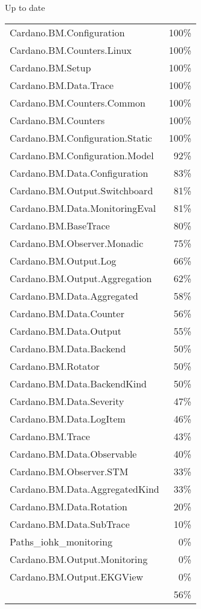 Up to date
\begin{tabular}{l r}
   Cardano.BM.Configuration & 100\% \\
   Cardano.BM.Counters.Linux & 100\% \\
   Cardano.BM.Setup & 100\% \\
   Cardano.BM.Data.Trace & 100\% \\
   Cardano.BM.Counters.Common & 100\% \\
   Cardano.BM.Counters & 100\% \\
   Cardano.BM.Configuration.Static & 100\% \\
   Cardano.BM.Configuration.Model & 92\% \\
   Cardano.BM.Data.Configuration & 83\% \\
   Cardano.BM.Output.Switchboard & 81\% \\
   Cardano.BM.Data.MonitoringEval & 81\% \\
   Cardano.BM.BaseTrace & 80\% \\
   Cardano.BM.Observer.Monadic & 75\% \\
   Cardano.BM.Output.Log & 66\% \\
   Cardano.BM.Output.Aggregation & 62\% \\
   Cardano.BM.Data.Aggregated & 58\% \\
   Cardano.BM.Data.Counter & 56\% \\
   Cardano.BM.Data.Output & 55\% \\
   Cardano.BM.Data.Backend & 50\% \\
   Cardano.BM.Rotator & 50\% \\
   Cardano.BM.Data.BackendKind & 50\% \\
   Cardano.BM.Data.Severity & 47\% \\
   Cardano.BM.Data.LogItem & 46\% \\
   Cardano.BM.Trace & 43\% \\
   Cardano.BM.Data.Observable & 40\% \\
   Cardano.BM.Observer.STM & 33\% \\
   Cardano.BM.Data.AggregatedKind & 33\% \\
   Cardano.BM.Data.Rotation & 20\% \\
   Cardano.BM.Data.SubTrace & 10\% \\
   Paths\_iohk\_monitoring & 0\% \\
   Cardano.BM.Output.Monitoring & 0\% \\
   Cardano.BM.Output.EKGView & 0\% \\
    & 56\% \\
\end{tabular}

